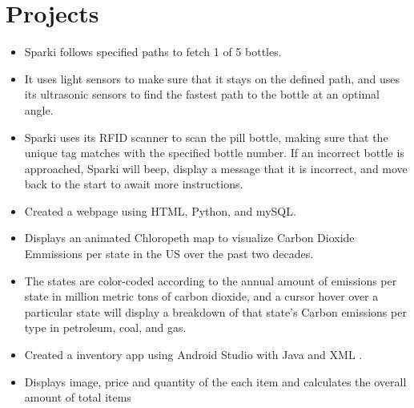 \documentclass[10pt,a4paper,sans]{moderncv} %
\begin{document}
\section {Projects}
\begin{itemize}
\vspace{-5mm}
\item{Sparki follows specified paths to fetch 1 of 5 bottles.} 
\item{It uses light sensors to make sure that it stays on the defined path, and uses its ultrasonic sensors to find the fastest path to the bottle at an optimal angle.} 
\item{Sparki uses its RFID scanner to scan the pill bottle, making sure that the unique tag  matches with the specified bottle number. If an incorrect bottle is approached, Sparki will beep, display a message that it is incorrect, and move back to the start to await more instructions.}
\end{itemize}

\hfill \break
{}
\begin{itemize}
\vspace{-5mm}
\item{Created a webpage using HTML, Python, and mySQL.}
\item{Displays an animated Chloropeth map to visualize Carbon Dioxide Emmissions per state in the US over the past two decades.}
\item{The states are color-coded according to the annual amount of emissions per state in million metric tons of carbon dioxide, and a cursor hover over a particular state will display a breakdown of that state's Carbon emissions per type in petroleum, coal, and gas.}
\end{itemize}
\hfill \break
{}
\begin{itemize}
\vspace{-5mm}
\item{Created a inventory app using Android Studio with Java and XML .}
\item{Displays image, price and quantity of the each item and calculates the overall amount of total items}
\end{itemize}
\end{document}
